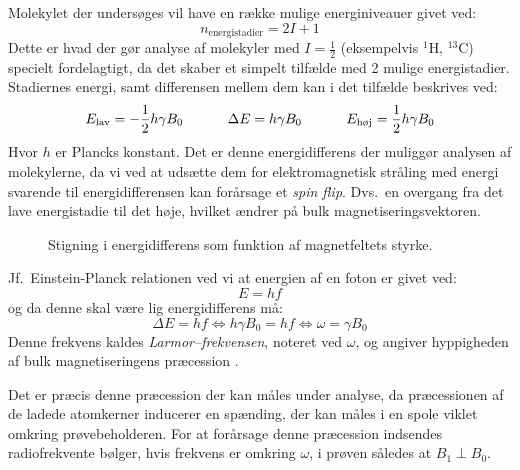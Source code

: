     Molekylet der undersøges vil have en række mulige energiniveauer givet ved:
    \[
        n_{\text{energistadier}}=2I+1
    \]
    Dette er hvad der gør analyse af molekyler med $I=\frac{1}{2}$ (eksempelvis $^1$H, $^{13}$C) specielt fordelagtigt, da det skaber et simpelt tilfælde med 2 mulige energistadier. Stadiernes energi, samt differensen mellem dem kan i det tilfælde beskrives ved:
    \[
        E_{\text{lav}}=-\frac{1}{2}h\gamma B_0 \hskip 32pt \Delta E=h\gamma B_0 \hskip 32pt E_{\text{høj}}=\frac{1}{2}h\gamma B_0
    \]
    Hvor $h$ er Plancks konstant. Det er denne energidifferens der muliggør analysen af molekylerne, da vi ved at udsætte dem for elektromagnetisk stråling med energi svarende til energidifferensen kan forårsage et \textit{spin flip}. Dvs.\ en overgang fra det lave energistadie til det høje, hvilket ændrer på bulk magnetiseringsvektoren. 
    \begin{figure}[H]
        \caption{Stigning i energidifferens som funktion af magnetfeltets styrke.}
    \end{figure}
    Jf.\ Einstein-Planck relationen ved vi at energien af en foton er givet ved:
    \[
        E=hf
    \]
    og da denne skal være lig energidifferens må:
    \[
        \Delta E=hf \Leftrightarrow h\gamma B_0 =hf \Leftrightarrow \omega=\gamma B_0 
    \]
    Denne frekvens kaldes \textit{Larmor--frekvensen}, noteret ved $\omega$, og angiver hyppigheden af bulk magnetiseringens præcession \parencite{Derr1,Derr2}.

    Det er præcis denne præcession der kan måles under analyse, da præcessionen af de ladede atomkerner inducerer en spænding, der kan måles i en spole viklet omkring prøvebeholderen. For at forårsage denne præcession indsendes radiofrekvente bølger, hvis frekvens er omkring $\omega$, i prøven således at $B_1 \perp B_0$. 

